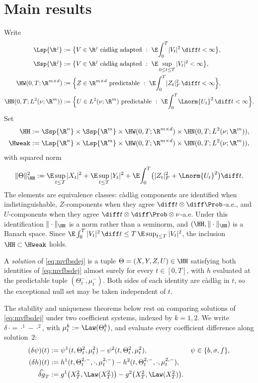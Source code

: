 \PaperPageBreak
\section{Main results}\label{sec:main}

Write
\[
\begin{aligned}
\Lsp{\R^j}&:=\bigl\{V\in\R^j\ \text{c\`adl\`ag adapted}\ :\ \E\!\int_0^T\!|V_t|^2\,\diff t<\infty\bigr\},\\
\Ssp{\R^j}&:=\bigl\{V\in\R^j\ \text{c\`adl\`ag adapted}\ :\ \E\sup_{0\le t\le T}|V_t|^2<\infty\bigr\},\\
\HW(0,T;\R^{m\times d})&:=\Bigl\{Z\in\R^{m\times d}\ \text{predictable}\ :\ \E\!\int_0^T\!|Z_t|_F^2\,\diff t<\infty\Bigr\},\\
\HN(0,T;L^2(\nu;\R^m))&:=\Bigl\{U\in L^2(\nu;\R^m)\ \text{predictable}\ :\ \E\!\int_0^T\!\Lnorm{U_t}^2\,\diff t<\infty\Bigr\}.
\end{aligned}
\]
Set
\[
\begin{aligned}
\HH&:=\Ssp{\R^n}\times\Ssp{\R^m}\times\HW(0,T;\R^{m\times d})\times\HN(0,T;L^2(\nu;\R^m)),\\
\Hweak&:=\Lsp{\R^n}\times\Lsp{\R^m}\times\HW(0,T;\R^{m\times d})\times\HN(0,T;L^2(\nu;\R^m)),
\end{aligned}
\]
with squared norm
\[
\|\Theta\|_{\HH}^2:=\E\sup_{t\le T}|X_t|^2+\E\sup_{t\le T}|Y_t|^2
+\E\!\int_0^T\!\big(|Z_t|_F^2+\Lnorm{U_t}^2\big)\diff t.
\]
The elements are equivalence classes: c\`adl\`ag components are identified when
indistinguishable, $Z$-components when they agree $\diff t\otimes\diff\Prob$-a.e., and
$U$-components when they agree $\diff t\otimes\diff\Prob\otimes\nu$-a.e. Under this
identification $\|\cdot\|_{\HH}$ is a norm rather than a seminorm, and
$(\HH,\|\cdot\|_{\HH})$ is a Banach space. Since
$\E\int_0^T|V_t|^2\,\diff t\le T\,\E\sup_{t\le T}|V_t|^2$, the inclusion
$\HH\subset\Hweak$ holds.

A \emph{solution} of \eqref{eq:mvfbsdej} is a tuple $\Theta=(X,Y,Z,U)\in\HH$ satisfying both
identities of \eqref{eq:mvfbsdej} almost surely for every $t\in[0,T]$, with $h$ evaluated at
the predictable tuple $(\Theta^-_t,\mu^-_t)$. Both sides of each identity are c\`adl\`ag in
$t$, so the exceptional null set may be taken independent of $t$.

The stability and uniqueness theorems below rest on comparing solutions of
\eqref{eq:mvfbsdej} under two coefficient systems, indexed by $k=1,2$. We write $\delta\,{\cdot}={\cdot}^1-{\cdot}^2$, with
$\mu^k_t:=\Law(\Theta^k_t)$, and evaluate every coefficient difference along solution~$2$:
\[
\begin{aligned}
(\delta\psi)(t)&:=\psi^1(t,\Theta^2_t,\mu^2_t)-\psi^2(t,\Theta^2_t,\mu^2_t),
&&\psi\in\{b,\sigma,f\},\\
(\delta h)(t)&:=h^1(t,\Theta^{2,-}_t,\cdot,\mu^{2,-}_t)-h^2(t,\Theta^{2,-}_t,\cdot,\mu^{2,-}_t),\\
\widehat{\delta g}_T&:=g^1\big(X^2_T,\Law(X^2_T)\big)-g^2\big(X^2_T,\Law(X^2_T)\big).
\end{aligned}
\]

